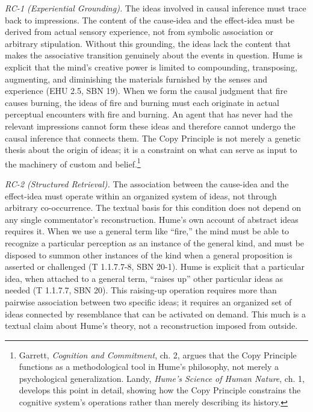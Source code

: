 \documentclass[11pt]{article}
\begin{document}
\emph{RC-1 (Experiential Grounding).} The ideas involved in causal inference must trace back to impressions. The content of the cause-idea and the effect-idea must be derived from actual sensory experience, not from symbolic association or arbitrary stipulation. Without this grounding, the ideas lack the content that makes the associative transition genuinely about the events in question. Hume is explicit that the mind's creative power is limited to compounding, transposing, augmenting, and diminishing the materials furnished by the senses and experience (EHU 2.5, SBN 19). When we form the causal judgment that fire causes burning, the ideas of fire and burning must each originate in actual perceptual encounters with fire and burning. An agent that has never had the relevant impressions cannot form these ideas and therefore cannot undergo the causal inference that connects them. The Copy Principle is not merely a genetic thesis about the origin of ideas; it is a constraint on what can serve as input to the machinery of custom and belief.\footnote{Garrett, \emph{Cognition and Commitment}, ch. 2, argues that the Copy Principle functions as a methodological tool in Hume's philosophy, not merely a psychological generalization. Landy, \emph{Hume's Science of Human Nature}, ch. 1, develops this point in detail, showing how the Copy Principle constrains the cognitive system's operations rather than merely describing its history.}

\emph{RC-2 (Structured Retrieval).} The association between the cause-idea and the effect-idea must operate within an organized system of ideas, not through arbitrary co-occurrence. The textual basis for this condition does not depend on any single commentator's reconstruction. Hume's own account of abstract ideas requires it. When we use a general term like ``fire,'' the mind must be able to recognize a particular perception as an instance of the general kind, and must be disposed to summon other instances of the kind when a general proposition is asserted or challenged (T 1.1.7.7-8, SBN 20-1). Hume is explicit that a particular idea, when attached to a general term, ``raises up'' other particular ideas as needed (T 1.1.7.7, SBN 20). This raising-up operation requires more than pairwise association between two specific ideas; it requires an organized set of ideas connected by resemblance that can be activated on demand. This much is a textual claim about Hume's theory, not a reconstruction imposed from outside.
\end{document}
